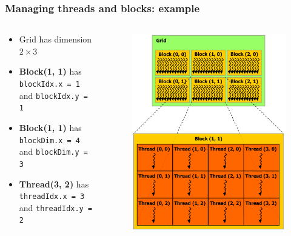 \documentclass[10pt, aspectratio=1610]{beamer}
\begin{document}
\begin{frame}
  \frametitle{Managing threads and blocks: example}

  \begin{columns}
    \begin{column}{0.7\textwidth}
      \begin{itemize}
        \item Grid has dimension $2 \times 3$
        \item \textbf{Block(1, 1)} has \lstinline{blockIdx.x = 1} and \lstinline{blockIdx.y = 1}
        \item \textbf{Block(1, 1)} has \lstinline{blockDim.x = 4} and \lstinline{blockDim.y = 3}
        \item \textbf{Thread(3, 2)} has \lstinline{threadIdx.x = 3} and \lstinline{threadIdx.y = 2}
      \end{itemize}
    \end{column}
    \begin{column}{0.25\textwidth}
      \begin{figure}
        \centering
        \includegraphics[width=\textwidth, height=0.8\textheight, keepaspectratio]{./img/block-thread.pdf}
      \end{figure}
    \end{column}
  \end{columns}

\end{frame}
\end{document}

